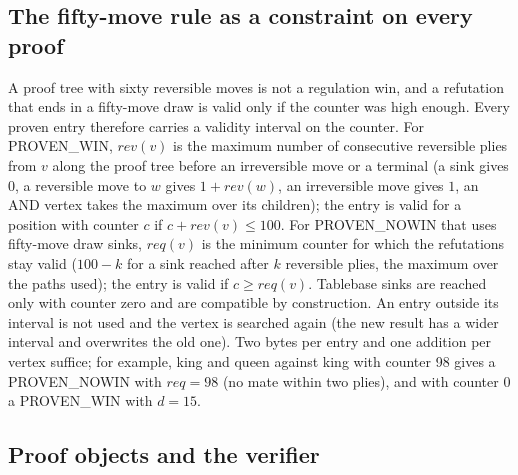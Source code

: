 \documentclass{article}
\theoremstyle{plain}
\theoremstyle{definition}
\theoremstyle{remark}
\newcommand{\PW}{\textsf{PROVEN\_WIN}}
\newcommand{\PN}{\textsf{PROVEN\_NOWIN}}
\begin{document}
\subsection{The fifty-move rule as a constraint on every proof}\label{sec:fifty}

A proof tree with sixty reversible moves is not a regulation win, and a refutation that ends in a fifty-move draw is valid only if the counter was high enough. Every proven entry therefore carries a validity interval on the counter. For \PW{}, $\mathit{rev}(v)$ is the maximum number of consecutive reversible plies from $v$ along the proof tree before an irreversible move or a terminal (a sink gives $0$, a reversible move to $w$ gives $1 + \mathit{rev}(w)$, an irreversible move gives $1$, an AND vertex takes the maximum over its children); the entry is valid for a position with counter $c$ if $c + \mathit{rev}(v) \leq 100$. For \PN{} that uses fifty-move draw sinks, $\mathit{req}(v)$ is the minimum counter for which the refutations stay valid ($100 - k$ for a sink reached after $k$ reversible plies, the maximum over the paths used); the entry is valid if $c \geq \mathit{req}(v)$. Tablebase sinks are reached only with counter zero and are compatible by construction. An entry outside its interval is not used and the vertex is searched again (the new result has a wider interval and overwrites the old one). Two bytes per entry and one addition per vertex suffice; for example, king and queen against king with counter 98 gives a \PN{} with $\mathit{req} = 98$ (no mate within two plies), and with counter 0 a \PW{} with $d = 15$.

\subsection{Proof objects and the verifier}\label{sec:verifier}
\end{document}
